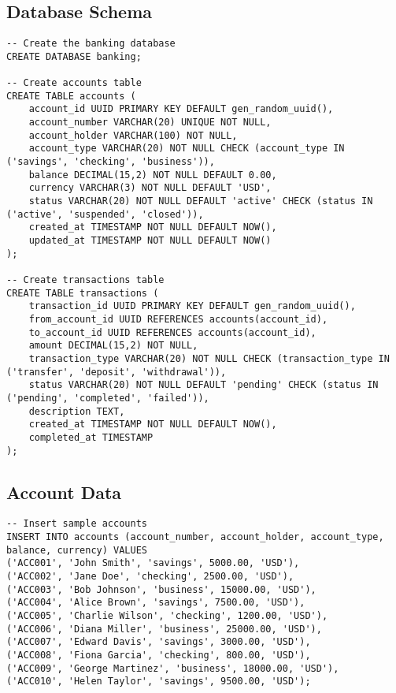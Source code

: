 \subsection{Database Schema}

\begin{verbatim}
-- Create the banking database
CREATE DATABASE banking;

-- Create accounts table
CREATE TABLE accounts (
    account_id UUID PRIMARY KEY DEFAULT gen_random_uuid(),
    account_number VARCHAR(20) UNIQUE NOT NULL,
    account_holder VARCHAR(100) NOT NULL,
    account_type VARCHAR(20) NOT NULL CHECK (account_type IN ('savings', 'checking', 'business')),
    balance DECIMAL(15,2) NOT NULL DEFAULT 0.00,
    currency VARCHAR(3) NOT NULL DEFAULT 'USD',
    status VARCHAR(20) NOT NULL DEFAULT 'active' CHECK (status IN ('active', 'suspended', 'closed')),
    created_at TIMESTAMP NOT NULL DEFAULT NOW(),
    updated_at TIMESTAMP NOT NULL DEFAULT NOW()
);

-- Create transactions table
CREATE TABLE transactions (
    transaction_id UUID PRIMARY KEY DEFAULT gen_random_uuid(),
    from_account_id UUID REFERENCES accounts(account_id),
    to_account_id UUID REFERENCES accounts(account_id),
    amount DECIMAL(15,2) NOT NULL,
    transaction_type VARCHAR(20) NOT NULL CHECK (transaction_type IN ('transfer', 'deposit', 'withdrawal')),
    status VARCHAR(20) NOT NULL DEFAULT 'pending' CHECK (status IN ('pending', 'completed', 'failed')),
    description TEXT,
    created_at TIMESTAMP NOT NULL DEFAULT NOW(),
    completed_at TIMESTAMP
);
\end{verbatim}

\subsection{Account Data}

\begin{verbatim}
-- Insert sample accounts
INSERT INTO accounts (account_number, account_holder, account_type, balance, currency) VALUES
('ACC001', 'John Smith', 'savings', 5000.00, 'USD'),
('ACC002', 'Jane Doe', 'checking', 2500.00, 'USD'),
('ACC003', 'Bob Johnson', 'business', 15000.00, 'USD'),
('ACC004', 'Alice Brown', 'savings', 7500.00, 'USD'),
('ACC005', 'Charlie Wilson', 'checking', 1200.00, 'USD'),
('ACC006', 'Diana Miller', 'business', 25000.00, 'USD'),
('ACC007', 'Edward Davis', 'savings', 3000.00, 'USD'),
('ACC008', 'Fiona Garcia', 'checking', 800.00, 'USD'),
('ACC009', 'George Martinez', 'business', 18000.00, 'USD'),
('ACC010', 'Helen Taylor', 'savings', 9500.00, 'USD');
\end{verbatim}

